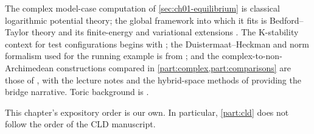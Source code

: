 The complex model-case computation of \cref{sec:ch01-equilibrium} is
classical logarithmic potential theory; the global framework into which it
fits is Bedford--Taylor theory \cite{BT76,BT82} and its finite-energy and
variational extensions \cite{BEGZ10,BBGZ13,GZ17}.  The K-stability context
for test configurations begins with \cite{Tia97,Don02}; the
Duistermaat--Heckman and norm formalism used for the running example is
from \cite{BHJ17}; and the complex-to-non-Archimedean constructions
compared in \cref{part:complex,part:comparisons} are those of
\cite{RWN14,DXZ23,MP24,MPWN25}, with the lecture notes \cite{BJ26ComplexNA}
and the hybrid-space methods of \cite{BJ17Hybrid} providing the bridge
narrative.  Toric background is \cite{CLS11,BGPS14}.

This chapter's expository order is our own.
In particular, \cref{part:cld} does not follow the order of the CLD manuscript.

